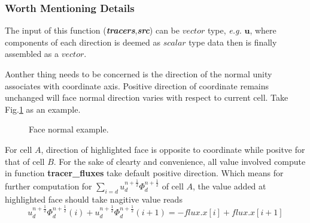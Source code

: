 \documentclass[a4paper]{article}
\newcommand{\func}[1]{\textbf{\textcolor{function}{#1}}}
\newcommand{\para}[1]{\textbf{\emph{\textcolor{para}{#1}}}}
\begin{document}
\subsubsection{Worth Mentioning Details}\label{sec:direction}
The input of this function (\para{tracers},\para{src}) can be $vector$ type, \emph{e.g.} $ \mathbf{u}$, where components of each direction is deemed as $scalar$ type data then is finally assembled as a $vector$.\par
Aonther thing needs to be concerned is the direction of the normal unity associates with coordinate axis. Positive direction of coordinate remains unchanged will face normal direction varies with respect to current cell. Take Fig.\ref{fig:facenormal} as an example. \begin{figure}[H]
  \centering
    \caption{Face normal example.}
    \label{fig:facenormal}
\end{figure}
For cell $A$, direction of highlighted face is opposite to coordinate while positve for that of cell $B$. For the sake of clearty and convenience, all value involved compute in function \func{tracer\_fluxes} take default positive direction. Which means for further computation for $\sum_{i=d}u_d^{n+ \frac{1}{2}}\Phi_d^{n+ \frac{1}{2}}$ of cell $A$, the value added at highlighted face should take nagitive value reads 
\begin{equation}
  u_d^{n+ \frac{1}{2}}\Phi_d^{n + \frac{1}{2}}(i)+u_d^{n+ \frac{1}{2}}\Phi_d^{n + \frac{1}{2}}(i+1) = -flux.x[i]+flux.x[i+1]
\end{equation}
\end{document}
